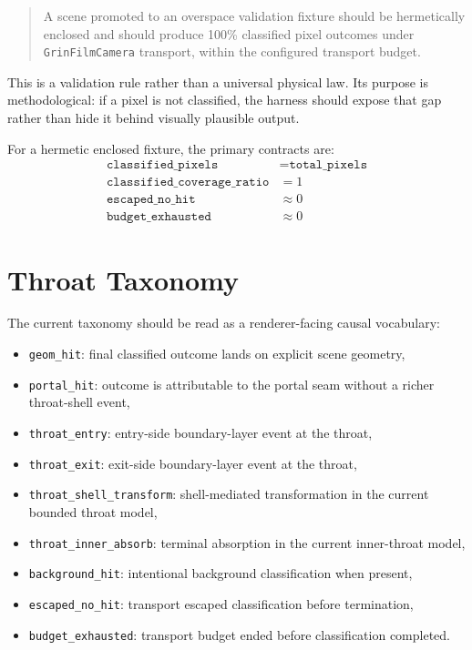 \documentclass[11pt]{article}
\begin{document}
\begin{quote}
A scene promoted to an overspace validation fixture should be hermetically enclosed and should produce 100\% classified pixel outcomes under \texttt{GrinFilmCamera} transport, within the configured transport budget.
\end{quote}

This is a validation rule rather than a universal physical law. Its purpose is methodological: if a pixel is not classified, the harness should expose that gap rather than hide it behind visually plausible output.

For a hermetic enclosed fixture, the primary contracts are:
\begin{align*}
\texttt{classified\_pixels} &= \texttt{total\_pixels} \\
\texttt{classified\_coverage\_ratio} &= 1 \\
\texttt{escaped\_no\_hit} &\approx 0 \\
\texttt{budget\_exhausted} &\approx 0
\end{align*}

\section{Throat Taxonomy}
The current taxonomy should be read as a renderer-facing causal vocabulary:
\begin{itemize}[leftmargin=1.5em]
\item \texttt{geom\_hit}: final classified outcome lands on explicit scene geometry,
\item \texttt{portal\_hit}: outcome is attributable to the portal seam without a richer throat-shell event,
\item \texttt{throat\_entry}: entry-side boundary-layer event at the throat,
\item \texttt{throat\_exit}: exit-side boundary-layer event at the throat,
\item \texttt{throat\_shell\_transform}: shell-mediated transformation in the current bounded throat model,
\item \texttt{throat\_inner\_absorb}: terminal absorption in the current inner-throat model,
\item \texttt{background\_hit}: intentional background classification when present,
\item \texttt{escaped\_no\_hit}: transport escaped classification before termination,
\item \texttt{budget\_exhausted}: transport budget ended before classification completed.
\end{itemize}
\end{document}
